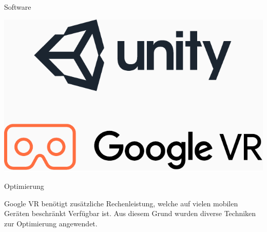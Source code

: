 \documentclass{beamer}
\begin{document}
  \begin{frame}{Software}
  	\begin{center}
  		\includegraphics[width=.75\textwidth]{bilder/googlevrunity.pdf}
  	\end{center}
  \end{frame}
  
  \begin{frame}{Optimierung}
  	\begin{center}
  		Google VR benötigt zusätzliche Rechenleistung, welche auf vielen mobilen Geräten beschränkt Verfügbar ist. Aus diesem Grund wurden diverse Techniken zur Optimierung angewendet.
  	\end{center}
  \end{frame}
  
\end{document}
